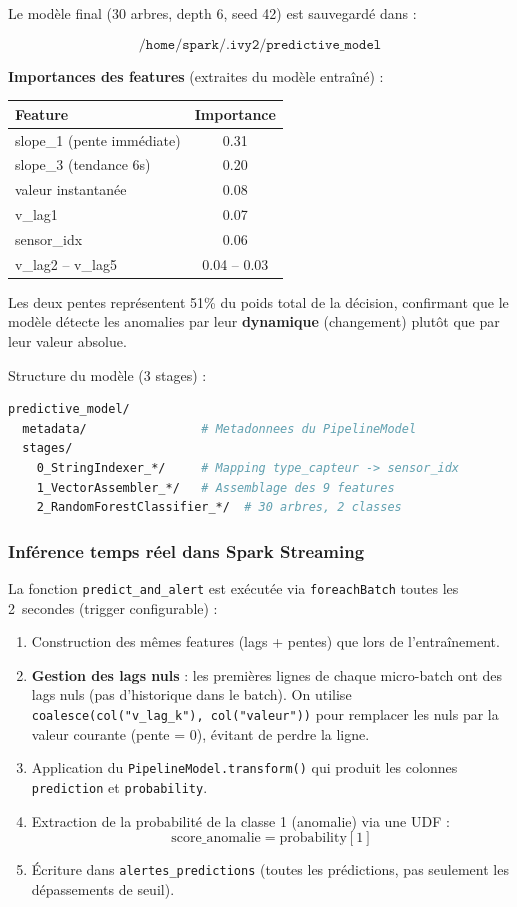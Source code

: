 \documentclass[12pt,a4paper]{article}
\begin{document}
Le modèle final (30 arbres, depth 6, seed 42) est sauvegardé dans :

\[
\texttt{/home/spark/.ivy2/predictive\_model}
\]

\textbf{Importances des features} (extraites du modèle entraîné) :

\begin{center}
\begin{tabular}{|l|c|}
\hline
\textbf{Feature} & \textbf{Importance} \\
\hline
slope\_1 (pente immédiate) & 0.31 \\
slope\_3 (tendance 6s) & 0.20 \\
valeur instantanée & 0.08 \\
v\_lag1 & 0.07 \\
sensor\_idx & 0.06 \\
v\_lag2 -- v\_lag5 & 0.04 -- 0.03 \\
\hline
\end{tabular}
\end{center}

Les deux pentes représentent 51\% du poids total de la décision, confirmant que le modèle détecte les anomalies par leur \textbf{dynamique} (changement) plutôt que par leur valeur absolue.

Structure du modèle (3 stages) :
\begin{lstlisting}[language=bash]
predictive_model/
  metadata/                # Metadonnees du PipelineModel
  stages/
    0_StringIndexer_*/     # Mapping type_capteur -> sensor_idx
    1_VectorAssembler_*/   # Assemblage des 9 features
    2_RandomForestClassifier_*/  # 30 arbres, 2 classes
\end{lstlisting}

\newpage

\subsubsection{Inférence temps réel dans Spark Streaming}

La fonction \texttt{predict\_and\_alert} est exécutée via \texttt{foreachBatch} toutes les 2~secondes (trigger configurable) :

\begin{enumerate}
    \item Construction des mêmes features (lags + pentes) que lors de l'entraînement.
    \item \textbf{Gestion des lags nuls} : les premières lignes de chaque micro-batch ont des lags nuls (pas d'historique dans le batch). On utilise \texttt{coalesce(col("v\_lag\_k"), col("valeur"))} pour remplacer les nuls par la valeur courante (pente = 0), évitant de perdre la ligne.
    \item Application du \texttt{PipelineModel.transform()} qui produit les colonnes \texttt{prediction} et \texttt{probability}.
    \item Extraction de la probabilité de la classe 1 (anomalie) via une UDF :
    \[
    \text{score\_anomalie} = \text{probability}[1]
    \]
    \item Écriture dans \texttt{alertes\_predictions} (toutes les prédictions, pas seulement les dépassements de seuil).
\end{enumerate}
\end{document}
